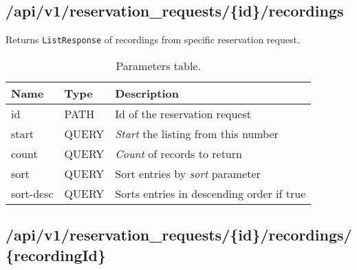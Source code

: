 \subsection{/api/v1/reservation\_requests/\{id\}/recordings}
Returns \texttt{ListResponse} of recordings from specific reservation request.
\begin{table}[ht!]
    \begin{tabularx}{\textwidth}{llX}
        \toprule
        Name & Type & Description \\
        \midrule
        id & PATH & Id of the reservation request \\ 
        start & QUERY & \emph{Start} the listing from this number \\  
        count & QUERY & \emph{Count} of records to return \\
        sort & QUERY & Sort entries by \emph{sort} parameter \\
        sort-desc & QUERY & Sorts entries in descending order if true \\
        \bottomrule
        \end{tabularx}
    \caption{Parameters table.}
\end{table}
\subsection{/api/v1/reservation\_requests/\{id\}/recordings/\{recordingId\}}


